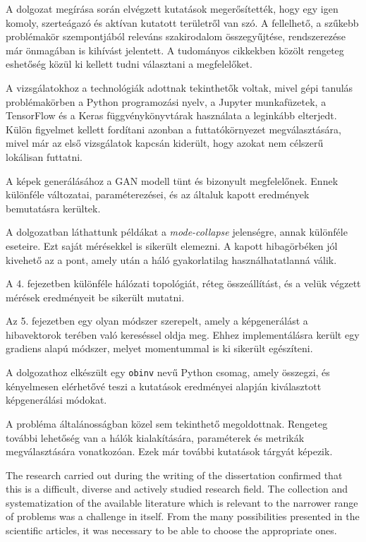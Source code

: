 
A dolgozat megírása során elvégzett kutatások megerősítették, hogy egy igen komoly, szerteágazó és aktívan kutatott területről van szó. A fellelhető, a szűkebb problémakör szempontjából releváns szakirodalom összegyűjtése, rendszerezése már önmagában is kihívást jelentett. A tudományos cikkekben közölt rengeteg eshetőség közül ki kellett tudni választani a megfelelőket.

A vizsgálatokhoz a technológiák adottnak tekinthetők voltak, mivel gépi tanulás problémakörben a Python programozási nyelv, a Jupyter munkafüzetek, a TensorFlow és a Keras függvénykönyvtárak használata a leginkább elterjedt. Külön figyelmet kellett fordítani azonban a futtatókörnyezet megválasztására, mivel már az első vizsgálatok kapcsán kiderült, hogy azokat nem célszerű lokálisan futtatni.

A képek generálásához a GAN modell tünt és bizonyult megfelelőnek. Ennek különféle változatai, paraméterezései, és az általuk kapott eredmények bemutatásra kerültek.

A dolgozatban láthattunk példákat a \textit{mode-collapse} jelenségre, annak különféle eseteire. Ezt saját mérésekkel is sikerült elemezni. A kapott hibagörbéken jól kivehető az a pont, amely után a háló gyakorlatilag használhatatlanná válik.

A 4. fejezetben különféle hálózati topológiát, réteg összeállítást, és a velük végzett mérések eredményeit be sikerült mutatni.

Az 5. fejezetben egy olyan módszer szerepelt, amely a képgenerálást a hibavektorok terében való kereséssel oldja meg. Ehhez implementálásra került egy gradiens alapú módszer, melyet momentummal is ki sikerült egészíteni.

A dolgozathoz elkészült egy \texttt{obinv} nevű Python csomag, amely összegzi, és kényelmesen elérhetővé teszi a kutatások eredményei alapján kiválasztott képgenerálási módokat.

A probléma általánosságban közel sem tekinthető megoldottnak. Rengeteg további lehetőség van a hálók kialakítására, paraméterek és metrikák megválasztására vonatkozóan. Ezek már további kutatások tárgyát képezik.


The research carried out during the writing of the dissertation confirmed that this is a difficult, diverse and actively studied research field. The collection and systematization of the available literature which is relevant to the narrower range of problems was a challenge in itself. From the many possibilities presented in the scientific articles, it was necessary to be able to choose the appropriate ones.

